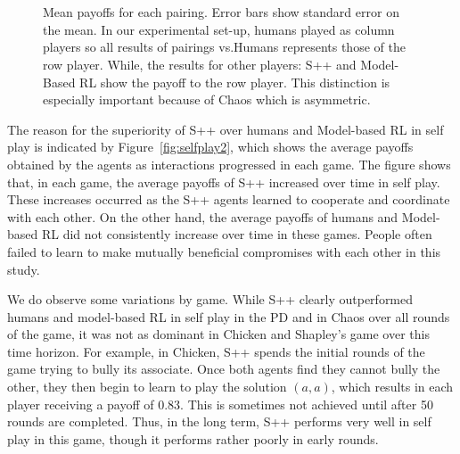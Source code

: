 \documentclass[fleqn,10pt]{SelfArx}
\begin{document}
\begin{figure*}
\begin{center}
	~~~~
	~~~~
	\\ \vspace{-.2in}
	~~~~~
	~~~~~
	 \vspace{-.1in}
\caption{Mean payoffs for each pairing.  Error bars show standard error on the mean. In our experimental set-up, humans played as column players so all results of pairings vs.Humans represents those of the row player. While, the results for other players: S++ and Model-Based RL show the payoff to the row player. This distinction is especially important because of Chaos which is asymmetric.}
\label{fig:againstOthers}
\end{center}
\end{figure*}


The reason for the superiority of S++ over humans and Model-based RL in self play is indicated by Figure~\ref{fig:selfplay2}, which shows the average payoffs obtained by the agents as interactions progressed in each game.  The figure shows that, in each game, the average payoffs of S++ increased over time in self play.  These increases occurred as the S++ agents learned to cooperate and coordinate with each other.  On the other hand, the average payoffs of humans and Model-based RL did not consistently increase over time in these games.  People often failed to learn to make mutually beneficial compromises with each other in this study.

We do observe some variations by game.  While S++ clearly outperformed humans and model-based RL in self play in the PD and in Chaos over all rounds of the game, it was not as dominant in Chicken and Shapley's game over this time horizon.  For example, in Chicken, S++ spends the initial rounds of the game trying to bully its associate.  Once both agents find they cannot bully the other, they then begin to learn to play the solution $(a,a)$, which results in each player receiving a payoff of 0.83.  This is sometimes not achieved until after 50 rounds are completed.  Thus, in the long term, S++ performs very well in self play in this game, though it performs rather poorly in early rounds.
\end{document}
